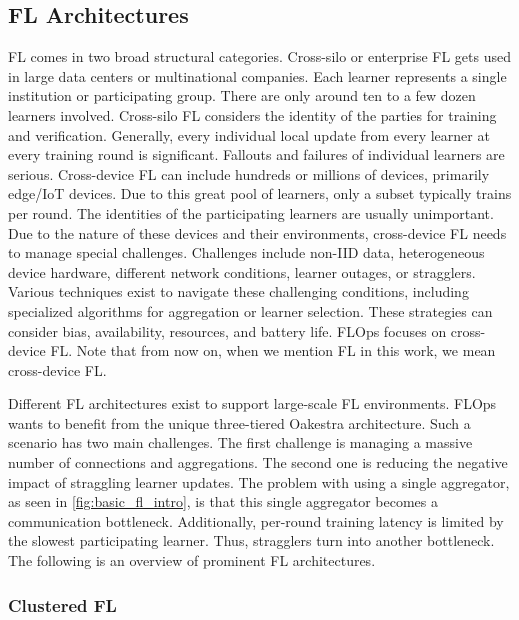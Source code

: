 \subsection{FL Architectures}

FL comes in two broad structural categories.
Cross-silo or enterprise FL gets used in large data centers or multinational companies.
Each learner represents a single institution or participating group.
There are only around ten to a few dozen learners involved.
Cross-silo FL considers the identity of the parties for training and verification.
Generally, every individual local update from every learner at every training round is significant.
Fallouts and failures of individual learners are serious.
Cross-device FL can include hundreds or millions of devices, primarily edge/IoT devices.
Due to this great pool of learners, only a subset typically trains per round.
The identities of the participating learners are usually unimportant.
Due to the nature of these devices and their environments, cross-device FL needs to manage special challenges.
Challenges include non-IID data, heterogeneous device hardware, different network conditions, learner outages, or stragglers.
Various techniques exist to navigate these challenging conditions, including specialized algorithms for aggregation or learner selection.
These strategies can consider bias, availability, resources, and battery life.
FLOps focuses on cross-device FL.
Note that from now on, when we mention FL in this work, we mean cross-device FL.

Different FL architectures exist to support large-scale FL environments.
FLOps wants to benefit from the unique three-tiered Oakestra \cite{paper:oakestra_usenix} architecture.
Such a scenario has two main challenges.
The first challenge is managing a massive number of connections and aggregations.
The second one is reducing the negative impact of straggling learner updates.
The problem with using a single aggregator, as seen in \ref{fig:basic_fl_intro}, is that this single aggregator becomes a communication bottleneck.
Additionally, per-round training latency is limited by the slowest participating learner.
Thus, stragglers turn into another bottleneck.
The following is an overview of prominent FL architectures.

\subsubsection{Clustered FL}

